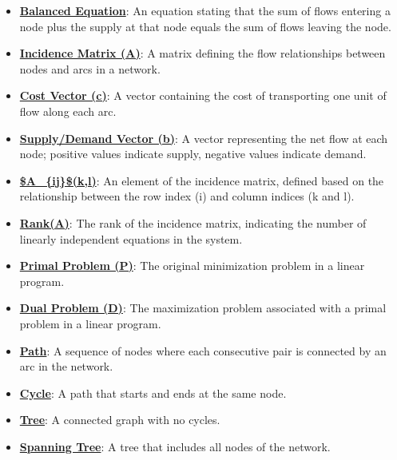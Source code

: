 \documentclass{article}%
\begin{document}
\begin{itemize}[leftmargin=*]
\item \href{https://www.math.purdue.edu/~yipn/421/2024-11-05-NetFlows.pdf#page=3}{\textbf{Balanced Equation}}: An equation stating that the sum of flows entering a node plus the supply at that node equals the sum of flows leaving the node.%
\item \href{https://www.math.purdue.edu/~yipn/421/2024-11-05-NetFlows.pdf#page=4}{\textbf{Incidence Matrix (A)}}: A matrix defining the flow relationships between nodes and arcs in a network.%
\item \href{https://www.math.purdue.edu/~yipn/421/2024-11-05-NetFlows.pdf#page=4}{\textbf{Cost Vector (c)}}: A vector containing the cost of transporting one unit of flow along each arc.%
\item \href{https://www.math.purdue.edu/~yipn/421/2024-11-05-NetFlows.pdf#page=4}{\textbf{Supply/Demand Vector (b)}}: A vector representing the net flow at each node; positive values indicate supply, negative values indicate demand.%
\item \href{https://www.math.purdue.edu/~yipn/421/2024-11-05-NetFlows.pdf#page=5}{\textbf{\$A\_\{ij\}\$(k,l)}}: An element of the incidence matrix, defined based on the relationship between the row index (i) and column indices (k and l).%
\item \href{https://www.math.purdue.edu/~yipn/421/2024-11-05-NetFlows.pdf#page=6}{\textbf{Rank(A)}}: The rank of the incidence matrix, indicating the number of linearly independent equations in the system.%
\item \href{https://www.math.purdue.edu/~yipn/421/2024-11-05-NetFlows.pdf#page=7}{\textbf{Primal Problem (P)}}: The original minimization problem in a linear program.%
\item \href{https://www.math.purdue.edu/~yipn/421/2024-11-05-NetFlows.pdf#page=7}{\textbf{Dual Problem (D)}}: The maximization problem associated with a primal problem in a linear program.%
\item \href{https://www.math.purdue.edu/~yipn/421/2024-11-05-NetFlows.pdf#page=10}{\textbf{Path}}: A sequence of nodes where each consecutive pair is connected by an arc in the network.%
\item \href{https://www.math.purdue.edu/~yipn/421/2024-11-05-NetFlows.pdf#page=10}{\textbf{Cycle}}: A path that starts and ends at the same node.%
\item \href{https://www.math.purdue.edu/~yipn/421/2024-11-05-NetFlows.pdf#page=10}{\textbf{Tree}}: A connected graph with no cycles.%
\item \href{https://www.math.purdue.edu/~yipn/421/2024-11-05-NetFlows.pdf#page=10}{\textbf{Spanning Tree}}: A tree that includes all nodes of the network.%

\end{itemize}
\end{document}
